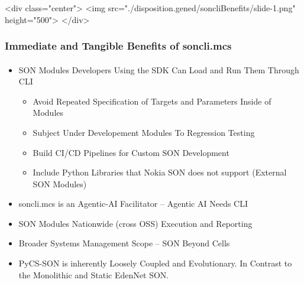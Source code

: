 \begin{htmlonly}

\begin{frame}[fragile,plain,label=soncliBenefits]
    \frametitle{}
    \framesubtitle{}
    \begin{rawhtml}
<div class="center">
<img src="./disposition.gened/soncliBenefits/slide-1.png" height="500">
</div>
    \end{rawhtml}
\end{frame}
\end{htmlonly}

\begin{verblatex}

\begin{frame}[fragile,plain,label=soncliBenefits]
    \frametitle{Immediate and Tangible Benefits of soncli.mcs}
    \framesubtitle{}

  \begin{itemize}
    \item SON Modules Developers Using the SDK Can Load and Run Them Through CLI
      \begin{itemize}
        \item Avoid Repeated Specification of Targets and Parameters Inside of Modules
        \item Subject Under Developement Modules To Regression Testing
        \item Build CI/CD Pipelines for Custom SON Development
        \item Include Python Libraries that Nokia SON does not support (External SON Modules)
      \end{itemize}
    \item soncli.mcs is an Agentic-AI Facilitator -- Agentic AI Needs CLI
    \item SON Modules Nationwide (cross OSS) Execution and Reporting
    \item Broader Systems Management Scope -- SON Beyond Cells
    \item PyCS-SON is inherently  Loosely Coupled and Evolutionary. In Contrast to the Monolithic and Static EdenNet SON.
  \end{itemize}


\end{frame}
\end{verblatex}
